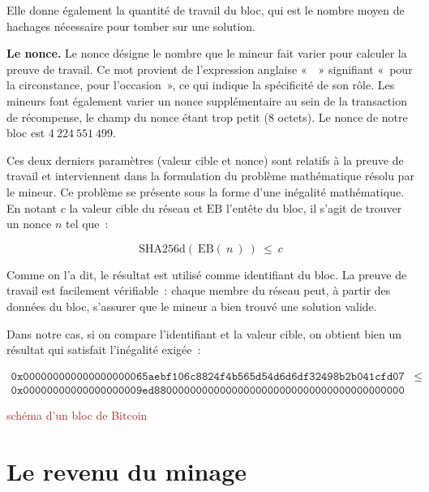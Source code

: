 Elle donne également la quantité de travail du bloc, qui est le nombre moyen de hachages nécessaire pour tomber sur une solution.


\textbf{Le nonce.} Le nonce désigne le nombre que le mineur fait varier pour calculer la preuve de travail. Ce mot provient de l'expression anglaise «~~» signifiant «~pour la circonstance, pour l'occasion~», ce qui indique la spécificité de son rôle. Les mineurs font également varier un nonce supplémentaire au sein de la transaction de récompense, le champ du nonce étant trop petit (8 octets). Le nonce de notre bloc est $4~224~551~499$.

Ces deux derniers paramètres (valeur cible et nonce) sont relatifs à la preuve de travail et interviennent dans la formulation du problème mathématique résolu par le mineur. Ce problème se présente sous la forme d'une inégalité mathématique. En notant $c$ la valeur cible du réseau et $\mathrm{EB}$ l'entête du bloc, il s'agit de trouver un nonce $n$ tel que~:

\[
\mathrm{SHA256d} ( \ \mathrm{EB} ( \ n \ ) \ ) ~ \le ~ c
\]

Comme on l'a dit, le résultat est utilisé comme identifiant du bloc. La preuve de travail est facilement vérifiable~: chaque membre du réseau peut, à partir des données du bloc, s'assurer que le mineur a bien trouvé une solution valide. %

Dans notre cas, si on compare l'identifiant et la valeur cible, on obtient bien un résultat qui satisfait l'inégalité exigée~: 

{ \footnotesize
\begin{align*}
\mathtt{0x000000000000000000065aebf106c8824f4b565d54d6d6df32498b2b041cfd07} & \le \\ \mathtt{0x00000000000000000009ed880000000000000000000000000000000000000000} & ~
\end{align*}
}

\textcolor{brown}{schéma d'un bloc de Bitcoin} %

\section*{Le revenu du minage} %

